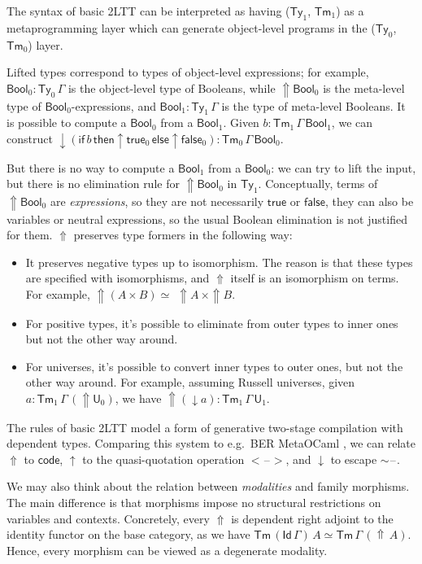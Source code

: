 \documentclass[12pt,a4paper,twoside,openany]{book}
\theoremstyle{remark}
\theoremstyle{definition}
\newcommand{\ms}[1]{\mathsf{#1}}
\newcommand{\Tm}{\mathsf{Tm}}
\newcommand{\Ty}{\mathsf{Ty}}
\newcommand{\U}{\mathsf{U}}
\newcommand{\Id}{\mathsf{Id}}
\newcommand{\blank}{\mathord{\hspace{1pt}\text{--}\hspace{1pt}}}
\newcommand{\Lift}{\Uparrow}
\newcommand{\Bool}{\ms{Bool}}
\newcommand{\true}{\ms{true}}
\newcommand{\false}{\ms{false}}
\newcommand{\up}{\uparrow}
\newcommand{\down}{\downarrow}
\begin{document}
The syntax of basic 2LTT can be interpreted as having ($\Ty_1$, $\Tm_1$) as a
metaprogramming layer which can generate object-level programs in the ($\Ty_0$,
$\Tm_0$) layer.

Lifted types correspond to types of object-level expressions; for example,
$\Bool_0 : \Ty_0\,\Gamma$ is the object-level type of Booleans, while
$\Lift\Bool_0$ is the meta-level type of $\Bool_0$-expressions, and $\Bool_1 :
\Ty_1\,\Gamma$ is the type of meta-level Booleans. It is possible to compute a
$\Bool_0$ from a $\Bool_1$. Given $b : \Tm_1\,\Gamma\,\Bool_1$, we can construct
$\down(\mathsf{if}\,b\,\mathsf{then}\up\!\true_0\,\mathsf{else}\up\!\false_0) :
\Tm_0\,\Gamma\,\Bool_0$.

But there is no way to compute a $\Bool_1$ from a $\Bool_0$: we can try to lift
the input, but there is no elimination rule for $\Lift\Bool_0$ in
$\Ty_1$. Conceptually, terms of $\Lift\Bool_0$ are \emph{expressions}, so they
are not necessarily $\true$ or $\false$, they can also be variables or neutral
expressions, so the usual Boolean elimination is not justified for them.
$\Lift$ preserves type formers in the following way:
\begin{itemize}
\item It preserves negative types up to isomorphism. The reason is that these
  types are specified with isomorphisms, and $\Lift$ itself is an isomorphism on
  terms. For example, $\Lift\!(A \times B) \simeq\,\, \Lift\!A\,\times
  \Lift\!B$.
\item For positive types, it's possible to eliminate from outer types to inner
      ones but not the other way around.
\item For universes, it's possible to convert inner types to outer ones, but not
  the other way around. For example, assuming Russell universes, given $a :
  \Tm_1\,\Gamma\,(\Lift \U_0)$, we have $\Lift (\down a) : \Tm_1\,\Gamma\,\U_1$.
\end{itemize}

The rules of basic 2LTT model a form of generative two-stage compilation with
dependent types. Comparing this system to e.g.\ BER MetaOCaml
\cite{kiselyov14metaocaml}, we can relate $\Lift$ to $\ms{code}$, $\up$ to
the quasi-quotation operation $<\!\blank\!>$, and $\down$ to escape
$\sim\!\blank$.

We may also think about the relation between \emph{modalities} and family
morphisms. The main difference is that morphisms impose no structural
restrictions on variables and contexts. Concretely, every $\Lift$ is dependent
right adjoint \cite{dependentrightadjoints} to the identity functor on the base
category, as we have $\Tm\,(\Id\,\Gamma)\,A \simeq
\Tm\,\Gamma\,(\Lift\,A)$. Hence, every morphism can be viewed as a degenerate
modality.
\end{document}
